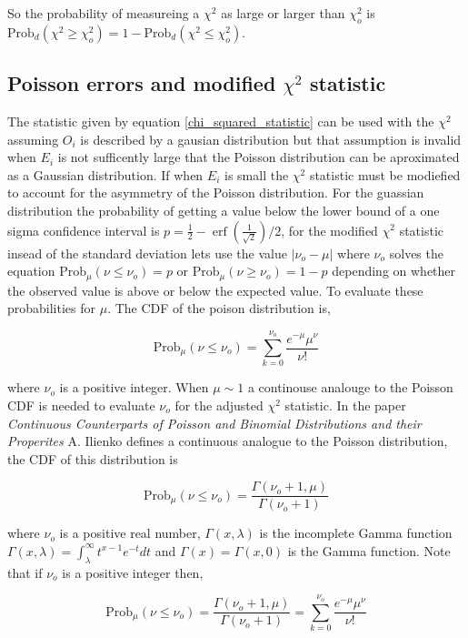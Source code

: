 \documentclass[%
 reprint,
 amsmath,amssymb,
 aps,
]{revtex4-1}
\begin{document}
So the probability of measureing a $\chi^2$ as large or larger than $\chi_o^2$ is $\text{Prob}_d(\chi^2 \geq \chi_o^2)=1-\text{Prob}_d(\chi^2 \leq \chi_o^2)$.

\subsection{Poisson errors and modified $\chi^2$ statistic}
The statistic given by equation \eqref{chi_squared_statistic} can be used with the $\chi^2$ assuming $O_i$ is described by a gausian distribution but that assumption is invalid when $E_i$ is not sufficently large that the Poisson distribution can be aproximated as a Gaussian distribution. If when $E_i$ is small the $\chi^2$ statistic must be modiefied to account for the asymmetry of the Poisson distribution. For the guassian distribution the probability of getting a value below the lower bound of a one sigma confidence interval is $p=\frac{1}{2} - \operatorname{erf}({\frac{1}{\sqrt{2}}})/2$, for the modified $\chi^2$ statistic insead of the standard deviation lets use the value $\left|\nu_o - \mu\right|$ where $\nu_o$ solves the equation $\text{Prob}_\mu\left(\nu \leq \nu_o\right)=p$ or $\text{Prob}_\mu\left(\nu \geq \nu_o\right)=1-p$ depending on whether the observed value is above or below the expected value. To evaluate these probabilities for $\mu$. The CDF of the poison distribution is,

\[
\text{Prob}_\mu\left(\nu \leq \nu_o\right)=\sum_{k=0}^{\nu_o}\frac{e^{-\mu}\mu^\nu}{\nu!}
\]

where $\nu_o$ is a positive integer. When $\mu \sim 1$ a continouse analouge to the Poisson CDF is needed to evaluate $\nu_o$ for the adjusted $\chi^2$ statistic. In the paper \textit{Continuous Counterparts of Poisson and Binomial Distributions and their Properites}\cite{continuous_poisson_paper} A. Ilienko defines a continuous analogue to the Poisson distribution, the CDF of this distribution is

\[
\text{Prob}_\mu\left(\nu \leq \nu_o\right)=\frac{\Gamma(\nu_o+1, \mu)}{\Gamma(\nu_o + 1)}
\]

where $\nu_o$ is a positive real number, $\Gamma(x, \lambda)$ is the incomplete Gamma function $\Gamma(x, \lambda)=\int_\lambda^\infty t^{x-1}e^{-t}dt$ and $\Gamma(x)=\Gamma(x, 0)$ is the Gamma function. Note that if $\nu_o$ is a positive integer then,

\[
\text{Prob}_\mu\left(\nu \leq \nu_o\right)=\frac{\Gamma(\nu_o+1, \mu)}{\Gamma(\nu_o + 1)}=\sum_{k=0}^{\nu_o}\frac{e^{-\mu}\mu^\nu}{\nu!}
\]
\end{document}
